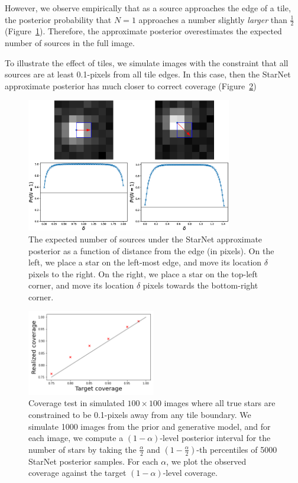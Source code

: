 However, we observe empirically that as a source approaches the edge of a tile,
the posterior probability that $N = 1$ approaches a number
slightly \textit{larger} than $\frac{1}{2}$ (Figure~\ref{fig:starnet_edges}).
Therefore, the approximate posterior overestimates the expected number of sources in the full image.

To illustrate the effect of tiles, we simulate images with the constraint that all sources are at least 0.1-pixels from all tile edges. 
In this case, then the StarNet approximate posterior has much closer to correct coverage (Figure~\ref{fig:coverage_good})

\begin{figure}[tb]
    \centering
    \includegraphics[width=0.8\textwidth]{./figures_vg/coverage/edges_example.eps}
    \vspace{-0.4cm}
    \caption{The expected number of sources under the StarNet approximate posterior as a function of distance from the edge (in pixels).
    On the left, we place a star on the left-most edge, and move its location $\delta$ pixels to the right.
    On the right, we place a star on the top-left corner, and move its location $\delta$ pixels towards the bottom-right corner.}
    \label{fig:starnet_edges}
\end{figure}

\begin{figure}[tb]
    \centering
    \includegraphics[width=0.5\textwidth]{./figures/coverage/good_coverage.png}
    \vspace{-0.4cm}
    \caption{Coverage test in simulated $100\times100$ images where all true stars are constrained to be 0.1-pixels away from any tile
    boundary.
    We simulate 1000 images from the prior and generative model, and for each image, we compute a $(1 - \alpha)$-level posterior interval for the number of stars by taking the $\frac{\alpha}{2}$ and $(1 -\frac{\alpha}{2})$-th percentiles of 5000 StarNet posterior samples.
    For each $\alpha$, we plot the observed coverage against the target $(1 - \alpha)$-level coverage. }
    \label{fig:coverage_good}
\end{figure}

